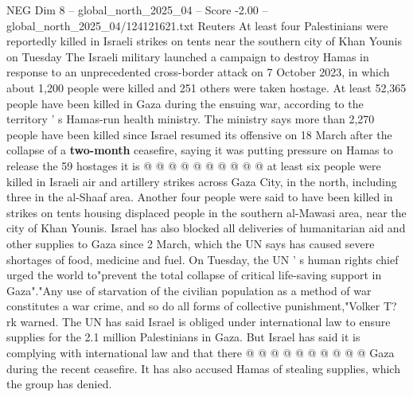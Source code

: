 \begin{textsample}{NEG Dim 8 – global\_north\_2025\_04 – Score -2.00 – global\_north\_2025\_04/124121621.txt}
Reuters At least four Palestinians were reportedly killed in Israeli strikes on tents near the southern city of Khan Younis on Tuesday The Israeli military launched a campaign to destroy Hamas in response to an unprecedented cross-border attack on 7 October 2023, in which about 1,200 people were killed and 251 others were taken hostage.
At least 52,365 people have been killed in Gaza during the ensuing war, according to the territory ' s Hamas-run health ministry.
The ministry says more than 2,270 people have been killed since Israel resumed its offensive on 18 March after the collapse of a \textbf{two-month} ceasefire, saying it was putting pressure on Hamas to release the 59 hostages it is @ @ @ @ @ @ @ @ @ @ at least six people were killed in Israeli air and artillery strikes across Gaza City, in the north, including three in the al-Shaaf area.
Another four people were said to have been killed in strikes on tents housing displaced people in the southern al-Mawasi area, near the city of Khan Younis.
Israel has also blocked all deliveries of humanitarian aid and other supplies to Gaza since 2 March, which the UN says has caused severe shortages of food, medicine and fuel.
On Tuesday, the UN ' s human rights chief urged the world to"prevent the total collapse of critical life-saving support in Gaza"."Any use of starvation of the civilian population as a method of war constitutes a war crime, and so do all forms of collective punishment,"Volker T? rk warned.
The UN has said Israel is obliged under international law to ensure supplies for the 2.1 million Palestinians in Gaza.
But Israel has said it is complying with international law and that there @ @ @ @ @ @ @ @ @ @ Gaza during the recent ceasefire.
It has also accused Hamas of stealing supplies, which the group has denied.

\end{textsample}
